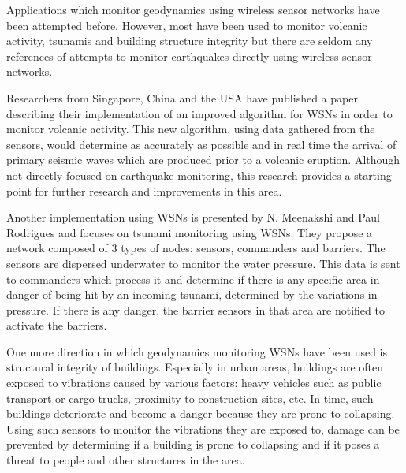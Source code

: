 Applications which monitor geodynamics using wireless sensor networks have been attempted before. However, most have been used to
monitor volcanic activity, tsunamis and building structure integrity but there are seldom any references of attempts to monitor 
earthquakes directly using wireless sensor networks.

Researchers from Singapore, China and the USA have published a paper describing their implementation of an improved algorithm 
for WSNs in order to monitor volcanic activity. This new algorithm, using data gathered from the sensors, would determine as accurately as 
possible and in real time the arrival of primary seismic waves which are produced prior to a volcanic eruption. Although not 
directly focused on earthquake monitoring, this research provides a starting point for further research and improvements in 
this area.

Another implementation using WSNs is presented by N. Meenakshi and Paul Rodrigues and focuses on tsunami monitoring using WSNs. 
They propose a network composed of 3 types of nodes: sensors, commanders and barriers. The sensors are dispersed underwater 
to monitor the water pressure. This data is sent to commanders which process it and determine if there is any specific area in danger 
of being hit by an incoming tsunami, determined by the variations in pressure. If there is any danger, the barrier sensors in 
that area are notified to activate the barriers.

One more direction in which geodynamics monitoring WSNs have been used is structural integrity of buildings. Especially in urban 
areas, buildings are often exposed to vibrations caused by various factors: heavy vehicles such as
public transport or cargo trucks, proximity to construction sites, etc. In time, such buildings deteriorate and become a danger 
because they are prone to collapsing. Using such sensors to monitor the vibrations they are exposed to, damage can be prevented 
by determining if a building is prone to collapsing and if it poses a threat to people and other structures in the area.

